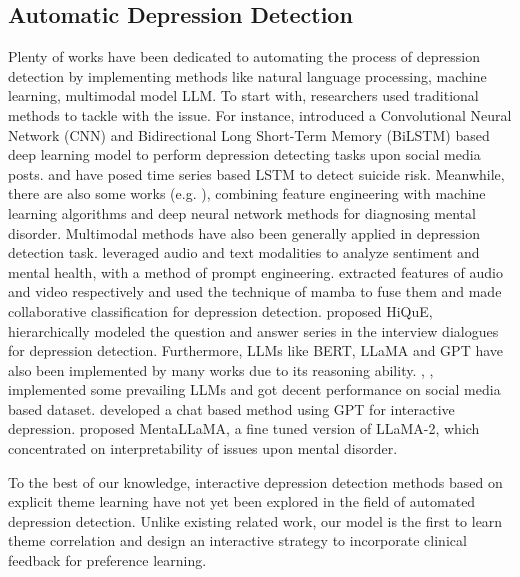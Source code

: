 \subsection{Automatic Depression Detection}
Plenty of works have been dedicated to automating the process of depression detection by implementing methods like natural language processing, machine learning, multimodal model LLM. To start with, researchers used traditional methods to tackle with the issue. For instance, \citet{Abdurrahim2024MentalHP} introduced a Convolutional Neural Network (CNN) and Bidirectional Long Short-Term Memory (BiLSTM) based deep learning model to perform depression detecting tasks upon social media posts. \citet{Cai2023DepressionDO} and \citet{10037751} have posed time series based LSTM to detect suicide risk. Meanwhile, there are also some works (e.g. \citealp{Wang2024SADTIMEAS, Yao2024Depression, YING2024106182, DAI20211040}), combining feature engineering with machine learning algorithms and deep neural network methods for diagnosing mental disorder. Multimodal methods have also been generally applied in depression detection task. \citet{Ali2024LeveragingAA} leveraged audio and text modalities to analyze sentiment and mental health, with a method of prompt engineering. \citet{Ye2024DepMambaPF} extracted features of audio and video respectively and used the technique of mamba to fuse them and made collaborative classification for depression detection. \citet{10.1145/3627673.3679797} proposed HiQuE, hierarchically modeled the question and answer series in the interview dialogues for depression detection. Furthermore, LLMs like BERT, LLaMA and GPT have also been implemented by many works due to its reasoning ability. \citet{Lan2024DepressionDO}, \citet{Shah2024AdvancingDD}, \citet{Kuzmin2024MentalDD} implemented some prevailing LLMs and got decent performance on social media based dataset. \citet{10354236} developed a chat based method using GPT for interactive depression. \citet{Yang2023MentaLLaMAIM} proposed MentaLLaMA, a fine tuned version of LLaMA-2, which concentrated on interpretability of issues upon mental disorder. 

To the best of our knowledge, interactive depression detection methods based on explicit theme learning have not yet been explored in the field of automated depression detection. Unlike existing related work, our model is the first to learn theme correlation and design an interactive strategy to incorporate clinical feedback for preference learning.

